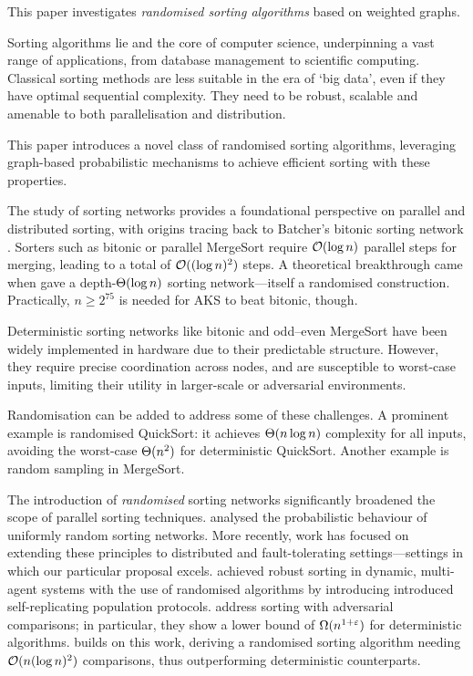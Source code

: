 \documentclass{article}
\begin{document}
This paper investigates \emph{randomised sorting algorithms} based on weighted graphs.

Sorting algorithms lie and the core of computer science, underpinning a vast range of applications, from database management to scientific computing.
Classical sorting methods are less suitable in the era of `big data', even if they have optimal sequential complexity.
They need to be robust, scalable and amenable to both parallelisation and distribution.

This paper introduces a novel class of randomised sorting algorithms, leveraging graph-based probabilistic mechanisms to achieve efficient sorting with these properties.

The study of sorting networks provides a foundational perspective on parallel and distributed sorting, with origins tracing back to Batcher's bitonic sorting network \cite{B:bitonic}.
Sorters such as bitonic \cite{B:bitonic} or parallel MergeSort \cite{C:parallel-mergesort} require $\mathcal{O}( \log n )$ parallel steps for merging, leading to a total of $\mathcal{O}( (\log n)^2 )$ steps.
A theoretical breakthrough came when \textcite{AKS:sorting:conf,AKS:sorting:jour} gave a depth-$\Theta( \log n )$ sorting network---itself a randomised construction.
Practically, $n \ge 2^{75}$ is needed for AKS to beat bitonic, though.

Deterministic sorting networks like bitonic and odd--even MergeSort have been widely implemented in hardware due to their predictable structure.
However, they require precise coordination across nodes, and are susceptible to worst-case inputs, limiting their utility in larger-scale or adversarial environments.

Randomisation can be added to address some of these challenges. A prominent example is randomised QuickSort: it achieves $\Theta( n \log n )$ complexity for all inputs, avoiding the worst-case $\Theta( n^2 )$ for deterministic QuickSort.
Another example is random sampling in MergeSort.

The introduction of \emph{randomised} sorting networks significantly broadened the scope of parallel sorting techniques.
\textcite{AHRV:random-sorting-networks} analysed the probabilistic behaviour of uniformly random sorting networks.
More recently, work has focused on extending these principles to distributed and fault-tolerating settings---settings in which our particular proposal excels.
\textcite{GSS:prob-bubble-sort} achieved robust sorting in dynamic, multi-agent systems with the use of randomised algorithms by introducing introduced self-replicating population protocols.
\textcite{AFHN:adversarial-sorting:jour,AFHN:adversarial-sorting:conf} address sorting with adversarial comparisons; in particular, they show a lower bound of $\Omega( n^{1+\varepsilon} )$ for deterministic algorithms.
\textcite{T:sorting-selection-adversary} builds on this work, deriving a randomised sorting algorithm needing $\mathcal{O}( n (\log n)^2 )$ comparisons, thus outperforming deterministic counterparts.
\end{document}
